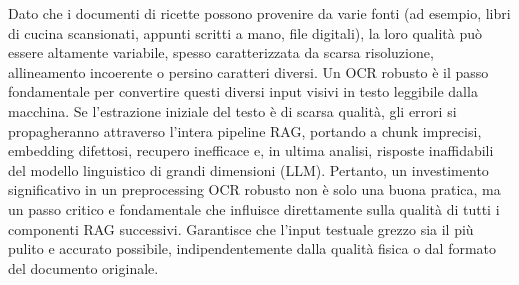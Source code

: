\documentclass[a4paper, 11pt]{article}
\begin{document}
Dato che i documenti di ricette possono provenire da varie fonti (ad esempio, libri di cucina scansionati, appunti scritti a mano, file digitali), la loro qualità può essere altamente variabile, spesso caratterizzata da scarsa risoluzione, allineamento incoerente o persino caratteri diversi. \cite{algodocs_challenges} Un OCR robusto è il passo fondamentale per convertire questi diversi input visivi in testo leggibile dalla macchina. Se l'estrazione iniziale del testo è di scarsa qualità, gli errori si propagheranno attraverso l'intera pipeline RAG, portando a chunk imprecisi, embedding difettosi, recupero inefficace e, in ultima analisi, risposte inaffidabili del modello linguistico di grandi dimensioni (LLM). Pertanto, un investimento significativo in un preprocessing OCR robusto non è solo una buona pratica, ma un passo critico e fondamentale che influisce direttamente sulla qualità di tutti i componenti RAG successivi. Garantisce che l'input testuale grezzo sia il più pulito e accurato possibile, indipendentemente dalla qualità fisica o dal formato del documento originale.
\end{document}

